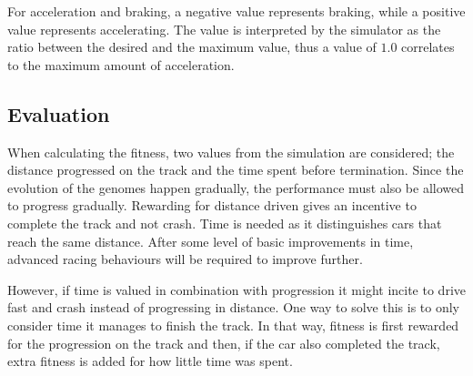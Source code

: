 For acceleration and braking, a negative value represents braking, while a positive value represents accelerating. The value is interpreted by the simulator as the ratio between the desired and the maximum value, thus a value of $1.0$ correlates to the maximum amount of acceleration.


\subsection{Evaluation}


When calculating the fitness, two values from the simulation are considered; the distance progressed on the track and the time spent before termination. Since the evolution of the genomes happen gradually, the performance must also be allowed to progress gradually. Rewarding for distance driven gives an incentive to complete the track and not crash. Time is needed as it distinguishes cars that reach the same distance. After some level of basic improvements in time, advanced racing behaviours will be required to improve further. 

However, if time is valued in combination with progression it might incite to drive fast and crash instead of progressing in distance. One way to solve this is to only consider time it manages to finish the track. In that way, fitness is first rewarded for the progression on the track and then, if the car also completed the track, extra fitness is added for how little time was spent.

